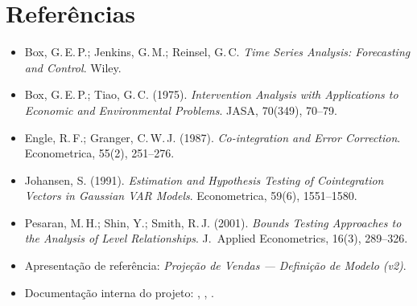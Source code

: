 \documentclass[11pt,a4paper]{article}
\begin{document}
\section*{Referências}
\small
\begin{itemize}
\item Box, G.\,E.\,P.; Jenkins, G.\,M.; Reinsel, G.\,C. \emph{Time Series Analysis: Forecasting and
Control}. Wiley.
\item Box, G.\,E.\,P.; Tiao, G.\,C. (1975). \emph{Intervention Analysis with Applications to
Economic and Environmental Problems}. JASA, 70(349), 70--79.
\item Engle, R.\,F.; Granger, C.\,W.\,J. (1987). \emph{Co-integration and Error Correction}.
Econometrica, 55(2), 251--276.
\item Johansen, S. (1991). \emph{Estimation and Hypothesis Testing of Cointegration Vectors in
Gaussian VAR Models}. Econometrica, 59(6), 1551--1580.
\item Pesaran, M.\,H.; Shin, Y.; Smith, R.\,J. (2001). \emph{Bounds Testing Approaches to the
Analysis of Level Relationships}. J.\ Applied Econometrics, 16(3), 289--326.
\item Apresentação de referência: \emph{Projeção de Vendas --- Definição de Modelo (v2)}.
\item Documentação interna do projeto: ,
, .
\end{itemize}
\end{document}
